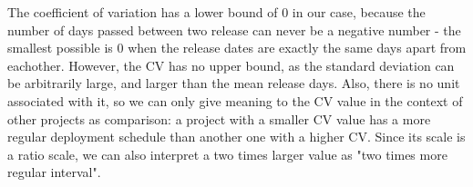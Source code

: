 \begin{table}
    \centering
    \caption{Release regularities for major, minor and patch releases.}
    \label{tab:regularity}
\end{table}

The coefficient of variation has a lower bound of $0$ in our case, because the number of days passed between two release can never be a negative number - the smallest possible is $0$ when the release dates are exactly the same days apart from eachother. However, the CV has no upper bound, as the standard deviation can be arbitrarily large, and larger than the mean release days. Also, there is no unit associated with it, so we can only give meaning to the CV value in the context of other projects as comparison: a project with a smaller CV value has a more regular deployment schedule than another one with a higher CV. Since its scale is a ratio scale, we can also interpret a two times larger value as "two times more regular interval".


